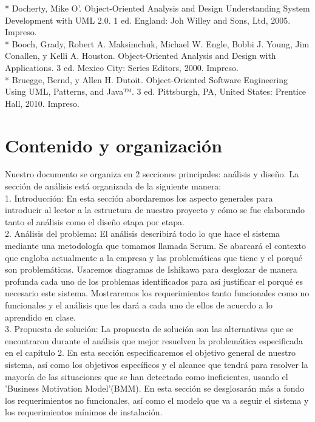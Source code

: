 * Docherty, Mike O'. Object-Oriented Analysis and Design Understanding System Development with UML 2.0. 1 ed. England: Joh Willey and Sons, Ltd, 2005. Impreso. \\

* Booch, Grady, Robert A. Maksimchuk, Michael W. Engle, Bobbi J. Young, Jim Conallen, y Kelli A.  Houston. Object-Oriented Analysis and Design with Applications. 3 ed. Mexico City: Series Editors, 2000. Impreso. \\

* Bruegge, Bernd, y Allen H. Dutoit. Object-Oriented Software Engineering Using UML, Patterns, and Java™. 3 ed. Pittsburgh, PA, United States: Prentice Hall, 2010. Impreso.

\section{Contenido y organización}

Nuestro documento se organiza en 2 secciones principales: análisis y diseño. La sección de análisis está organizada de la siguiente manera: \\

1. Introducción: En esta sección abordaremos los aspecto generales para introducir al lector a la estructura de nuestro proyecto y cómo se fue elaborando tanto el análisis como el diseño etapa por etapa. \\

2. Análisis del problema: El análisis describirá todo lo que hace el sistema mediante una metodología que tomamos llamada Scrum. Se abarcará el contexto que engloba actualmente a la empresa y las problemáticas que tiene y el porqué son problemáticas. Usaremos diagramas de Ishikawa para desglozar de manera profunda cada uno de los problemas identificados para así justificar el porqué es necesario este sistema. Mostraremos los requerimientos tanto funcionales como no funcionales y el análisis que les dará a cada uno de ellos de acuerdo a lo aprendido en clase. \\

3. Propuesta de solución: La propuesta de solución son las alternativas que se encontraron durante el análisis que mejor resuelven la problemática especificada en el capítulo 2. En esta sección especificaremos el objetivo general de nuestro sistema, así como los objetivos específicos y el alcance que tendrá para resolver la mayoría de las situaciones que se han detectado como ineficientes, usando el 'Business Motivation Model'(BMM). En esta sección se desglosarán más a fondo los requerimientos no funcionales, así como el modelo que va a seguir el sistema y los requerimientos mínimos de instalación. \\

